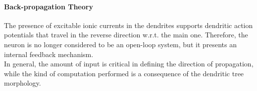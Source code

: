 \paragraph{Back-propagation Theory} The presence of excitable ionic currents in the
dendrites supports dendritic action potentials that travel in the reverse direction
w.r.t. the main one. Therefore, the neuron is no longer considered to be an
open-loop system, but it presents an internal feedback mechanism.\\
In general, the amount of input is critical in defining the direction of
propagation, while the kind of computation performed is a consequence of
the dendritic tree morphology.